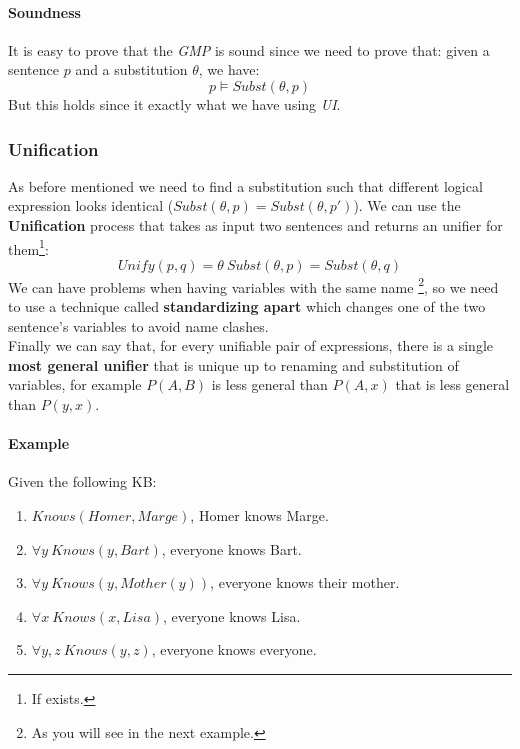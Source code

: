 \documentclass[10pt,a4paper]{article}
\newcommand{\subst}[1]{Subst(\theta,#1)}
\begin{document}
\paragraph{Soundness}
It is easy to prove that the \textit{GMP} is sound since we need to prove that: given a sentence $p$ and a substitution $\theta$, we have:
\[p \models Subst(\theta,p)\] 
But this holds since it exactly what we have using \textit{UI}.

\subsubsection{Unification}
As before mentioned we need to find a substitution such that different logical expression looks identical ($\subst{p}=\subst{p'}$). We can use the \textbf{Unification} process that takes as input two sentences and returns an unifier for them\footnote{If exists.}:
\[Unify(p,q)=\theta\ \subst{p}=\subst{q}\]
We can have problems when having variables with the same name \footnote{As you will see in the next example.}, so we need to use a technique called \textbf{standardizing apart} which changes one of the two sentence's variables to avoid name clashes.\\
Finally we can say that, for every unifiable pair of expressions, there is a single \textbf{most general unifier} that is unique up to renaming and substitution of variables, for example $P(A,B)$ is less general than $P(A,x)$ that is less general than $P(y,x)$. 

\paragraph{Example}
Given the following KB:
\begin{enumerate}
\item $Knows(Homer, Marge)$, Homer knows Marge.
\item $\forall y\ Knows(y,Bart)$, everyone knows Bart.
\item $\forall y\ Knows(y,Mother(y))$, everyone knows their mother.
\item $\forall x\ Knows(x,Lisa)$, everyone knows Lisa.
\item $\forall y,z\ Knows(y,z)$, everyone knows everyone.
\end{enumerate}
\end{document}
